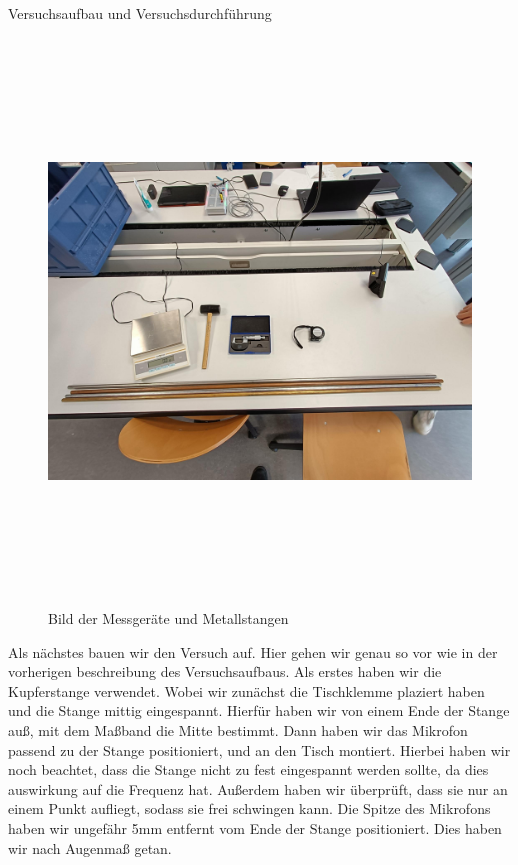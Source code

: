 \documentclass[twoside]{protokoll}
\begin{document}
\begin{aufgabe}{Versuchsaufbau und Versuchsdurchführung}
\begin{figure}[h]
  \centering
  \includegraphics[width=15cm,height=15cm,keepaspectratio]{Bilder/Materialien.jpeg}
  \caption{Bild der Messgeräte und Metallstangen}
  \label{fig:image_label}
  \centering
\end{figure}

Als nächstes bauen wir den Versuch auf. Hier gehen wir genau so vor wie in der vorherigen beschreibung des Versuchsaufbaus. Als erstes haben wir die Kupferstange verwendet.
Wobei wir zunächst die Tischklemme plaziert haben und die Stange mittig eingespannt. Hierfür haben wir von einem Ende der Stange auß, mit dem Maßband die Mitte bestimmt. Dann haben wir das Mikrofon passend zu der Stange positioniert, und an den Tisch montiert. Hierbei haben wir noch beachtet, dass die Stange nicht zu fest eingespannt werden sollte, da dies auswirkung auf die Frequenz hat. Außerdem haben wir überprüft, dass sie nur an einem Punkt aufliegt, sodass sie frei schwingen kann. Die Spitze des Mikrofons haben wir ungefähr 5mm entfernt vom Ende der Stange positioniert. Dies haben wir nach Augenmaß getan. 


\end{aufgabe}
\end{document}
